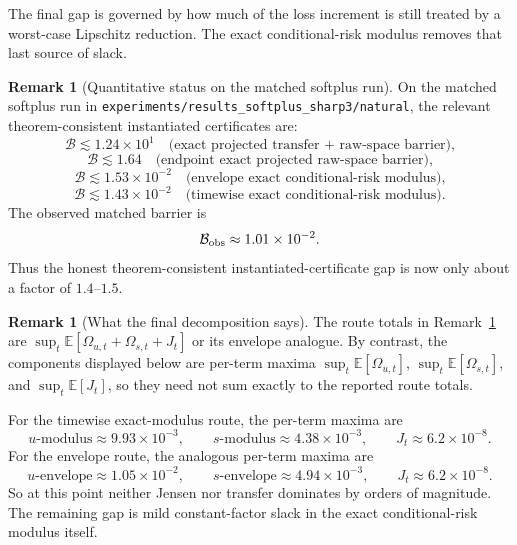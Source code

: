\documentclass[11pt]{article}
\theoremstyle{definition}
\newtheorem{remark}[theorem]{Remark}
\newcommand{\E}{\mathbb{E}}
\newcommand{\cB}{\mathcal{B}}
\begin{document}
The final gap is governed by how much of the loss increment is still treated by
a worst-case Lipschitz reduction. The exact conditional-risk modulus removes
that last source of slack.

\begin{remark}[Quantitative status on the matched softplus run]
\label{rem:quantitative-status}
On the matched softplus run in
\texttt{experiments/results\_softplus\_sharp3/natural}, the relevant
theorem-consistent instantiated certificates are:
\[
  \cB \lesssim 1.24\times 10^1
  \quad\text{(exact projected transfer + raw-space barrier),}
\]
\[
  \cB \lesssim 1.64
  \quad\text{(endpoint exact projected raw-space barrier),}
\]
\[
  \cB \lesssim 1.53\times 10^{-2}
  \quad\text{(envelope exact conditional-risk modulus),}
\]
\[
  \cB \lesssim 1.43\times 10^{-2}
  \quad\text{(timewise exact conditional-risk modulus).}
\]
The observed matched barrier is
\[
  \cB_{\rm obs}\approx 1.01\times 10^{-2}.
\]
Thus the honest theorem-consistent instantiated-certificate gap is now only
about a factor of $1.4$--$1.5$.
\end{remark}

\begin{remark}[What the final decomposition says]
The route totals in Remark~\ref{rem:quantitative-status} are
$\sup_t\E[\Omega_{u,t}+\Omega_{s,t}+J_t]$ or its envelope analogue. By
contrast, the components displayed below are per-term maxima
$\sup_t\E[\Omega_{u,t}]$, $\sup_t\E[\Omega_{s,t}]$, and $\sup_t\E[J_t]$, so
they need not sum exactly to the reported route totals.

For the timewise exact-modulus route, the per-term maxima are
\[
  \text{$u$-modulus}\approx 9.93\times 10^{-3},
  \qquad
  \text{$s$-modulus}\approx 4.38\times 10^{-3},
  \qquad
  J_t\approx 6.2\times 10^{-8}.
\]
For the envelope route, the analogous per-term maxima are
\[
  \text{$u$-envelope}\approx 1.05\times 10^{-2},
  \qquad
  \text{$s$-envelope}\approx 4.94\times 10^{-3},
  \qquad
  J_t\approx 6.2\times 10^{-8}.
\]
So at this point neither Jensen nor transfer dominates by orders of magnitude.
The remaining gap is mild constant-factor slack in the exact conditional-risk
modulus itself.
\end{remark}
\end{document}
